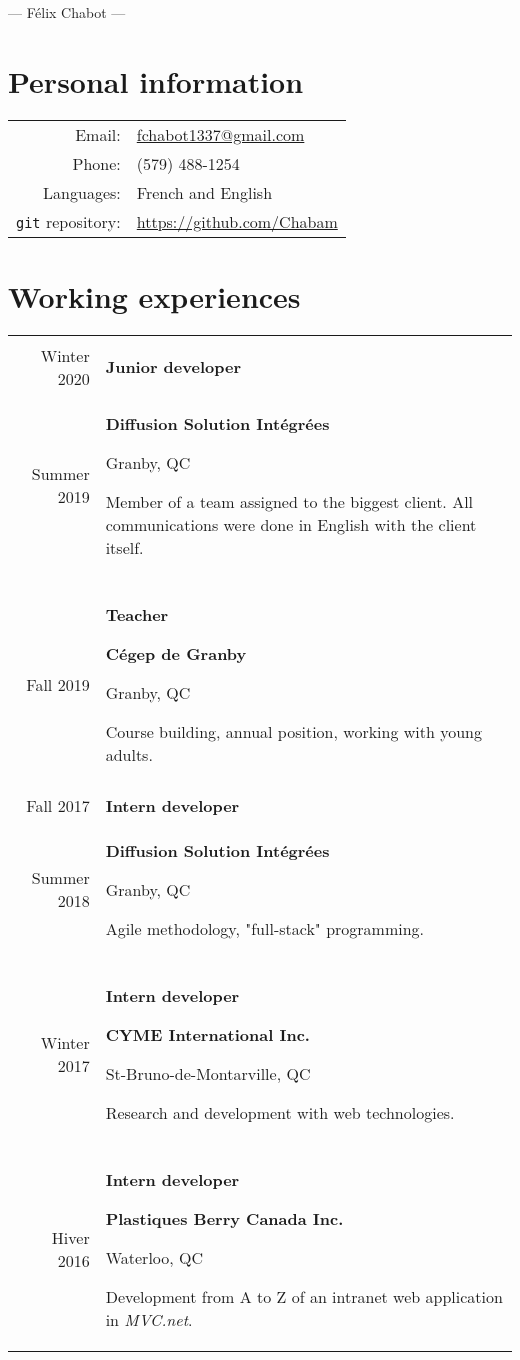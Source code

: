 \documentclass{article}
\newcommand{\separation}{\multicolumn{1}{c}{} \\}
\begin{document}
	\begin{center}
		{\Huge --- Félix Chabot ---}
	\end{center}

	\section{Personal information}
	\begin{tabu} to \textwidth {rX}
		Email: & \href{mailto:fchabot1337@gmail.com}{fchabot1337@gmail.com} \\
		Phone: & (579) 488-1254 \\
		Languages: & French and English \\
		\texttt{git} repository: & \url{https://github.com/Chabam}
	\end{tabu}
	\section{Working experiences}
	\begin{tabu} to \textwidth {r|X}
		\separation{}
		Winter 2020 & {\large \bfseries Junior developer} \\
		Summer 2019 & {

			\textbf{Diffusion Solution Intégrées}

			{\footnotesize Granby, QC}

			Member of a team assigned to the biggest client. All communications were done in English with the client itself.
		} \\

		\separation{}

		Fall 2019 & {
			{\large \bfseries Teacher}

			\textbf{Cégep de Granby}

			{\footnotesize Granby, QC}

			Course building, annual position, working with young adults.
		} \\


		\separation{}
		Fall 2017 & {\large \bfseries Intern developer} \\
		Summer 2018 & {
			\textbf{Diffusion Solution Intégrées}

			{\footnotesize Granby, QC}

			Agile methodology, "full-stack" programming.
		} \\

		\separation{}
		Winter 2017 & {
			{\large \bfseries Intern developer}

			\textbf{CYME International Inc.}

			{\footnotesize St-Bruno-de-Montarville, QC}

			Research and development with web technologies.
		} \\

		\separation{}
		Hiver 2016 & {
			{\large \bfseries Intern developer}

			\textbf{Plastiques Berry Canada Inc.}

			{\footnotesize Waterloo, QC}

			Development from A to Z of an intranet web application in \textit{MVC.net}.
		} \\
	\end{tabu}
\end{document}
